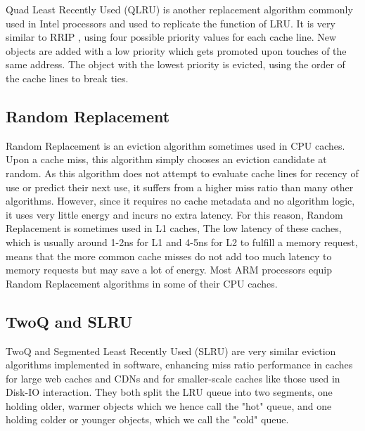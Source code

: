 \documentclass[sigconf, screen, review]{acmart}
\begin{document}

Quad Least Recently Used (QLRU) is another replacement algorithm
commonly used in Intel processors and used to replicate the function of LRU.
It is very similar to RRIP \cite{RRIP}, using four possible priority values for each cache line.
New objects are added with a low priority which gets promoted upon touches of the same address.
The object with the lowest priority is evicted, using the order of the cache lines to break ties.

\subsection{Random Replacement}

Random Replacement is an eviction algorithm sometimes used in CPU caches.
Upon a cache miss, this algorithm simply chooses an eviction candidate at random.
As this algorithm does not attempt to evaluate cache lines for recency of use
or predict their next use, it suffers from a higher miss ratio than many other algorithms.
However, since it requires no cache metadata and no algorithm logic,
it uses very little energy and incurs no extra latency.
For this reason, Random Replacement is sometimes used in L1 caches,
The low latency of these caches, which is usually around 1-2ns for L1
and 4-5ns for L2 to fulfill a memory request,
means that the more common cache misses do not add too much latency to memory requests
but may save a lot of energy.
Most ARM processors equip Random Replacement algorithms in some of their CPU caches.

\subsection{TwoQ and SLRU}

TwoQ \cite{TwoQ} and Segmented Least Recently Used (SLRU) \cite{SLRU}
are very similar eviction algorithms implemented in software,
enhancing miss ratio performance in caches for large web caches and CDNs
and for smaller-scale caches like those used in Disk-IO interaction.
They both split the LRU queue into two segments, one holding older, warmer objects
which we hence call the "hot" queue,
and one holding colder or younger objects,
which we call the "cold" queue.
\end{document}
